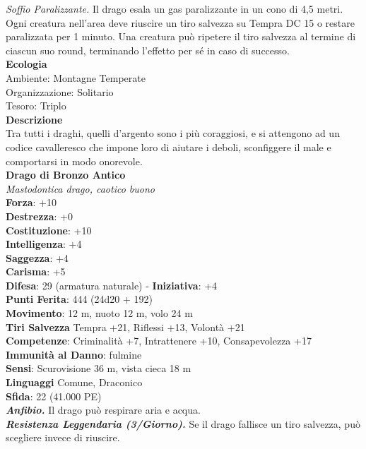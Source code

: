 \begin{multicols}{2}
\emph{Soffio Paralizzante.} Il drago esala un gas paralizzante in un cono di 4,5 metri. Ogni creatura nell'area deve riuscire un tiro salvezza su Tempra DC  15 o restare paralizzata per 1 minuto. Una creatura può ripetere il tiro salvezza al termine di ciascun suo round, terminando l'effetto per sé in caso di successo.\\
\textbf{Ecologia}\\
Ambiente: Montagne Temperate\\
Organizzazione: Solitario\\
Tesoro: Triplo\\
\textbf{Descrizione}\\
Tra tutti i draghi, quelli d'argento sono i più coraggiosi, e si attengono ad un codice cavalleresco che impone loro di aiutare i deboli, sconfiggere il male e comportarsi in modo onorevole.\\
\medskip\textbf{Drago di Bronzo Antico}\\
\emph{Mastodontica drago, caotico buono}\\
\textbf{Forza}: +10\\
\textbf{Destrezza}: +0\\
\textbf{Costituzione}: +10\\
\textbf{Intelligenza}: +4\\
\textbf{Saggezza}: +4\\
\textbf{Carisma}: +5\\
\textbf{Difesa}: 29 (armatura naturale) - \textbf{Iniziativa}: +4\\
\textbf{Punti Ferita}: 444 (24d20 + 192)\\
\textbf{Movimento}: 12 m, nuoto 12 m, volo 24 m\\
\textbf{Tiri Salvezza} Tempra +21, Riflessi +13, Volontà +21\\
\textbf{Competenze}: Criminalità +7, Intrattenere +10, Consapevolezza +17\\
\textbf{Immunità al Danno}: fulmine\\
\textbf{Sensi}: Scurovisione 36 m, vista cieca 18 m\\
\textbf{Linguaggi} Comune, Draconico\\
\textbf{Sfida}: 22 (41.000 PE)\smallskip\\
\emph{\textbf{Anfibio.}} Il drago può respirare aria e acqua.\\
\emph{\textbf{Resistenza Leggendaria (3/Giorno).}} Se il drago fallisce un tiro salvezza, può scegliere invece di riuscire. \\

\end{multicols}
